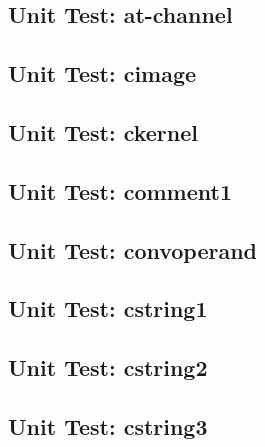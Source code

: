 \subsection*{Unit Test: at-channel}

 \clearpage
\subsection*{Unit Test: cimage}

 \clearpage
\subsection*{Unit Test: ckernel}

 \clearpage
\subsection*{Unit Test: comment1}

 \clearpage
\subsection*{Unit Test: convoperand}

 \clearpage
\subsection*{Unit Test: cstring1}

 \clearpage
\subsection*{Unit Test: cstring2}

 \clearpage
\subsection*{Unit Test: cstring3}

 \clearpage
